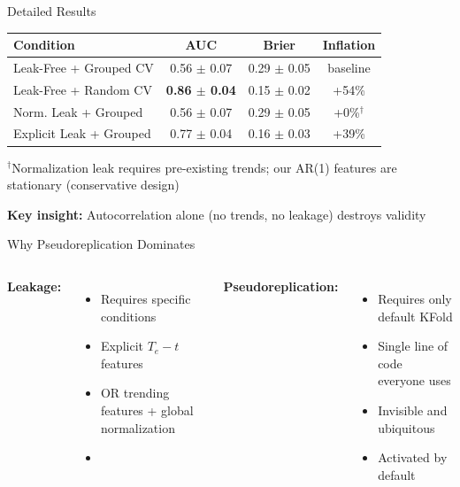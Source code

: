 \documentclass[aspectratio=169]{beamer}
\begin{document}
\begin{frame}{Detailed Results}
\begin{table}
\centering
\small
\begin{tabular}{lccc}
\toprule
\textbf{Condition} & \textbf{AUC} & \textbf{Brier} & \textbf{Inflation} \\
\midrule
Leak-Free + Grouped CV & 0.56 $\pm$ 0.07 & 0.29 $\pm$ 0.05 & baseline \\
\rowcolor{red!10}
Leak-Free + Random CV & \textbf{0.86 $\pm$ 0.04} & 0.15 $\pm$ 0.02 & \alert{+54\%} \\
Norm. Leak + Grouped & 0.56 $\pm$ 0.07 & 0.29 $\pm$ 0.05 & +0\%$^\dagger$ \\
Explicit Leak + Grouped & 0.77 $\pm$ 0.04 & 0.16 $\pm$ 0.03 & +39\% \\
\bottomrule
\end{tabular}
\end{table}

\vspace{0.5em}
\footnotesize
$^\dagger$Normalization leak requires pre-existing trends; our AR(1) features are stationary (conservative design)

\vspace{1em}
\textbf{Key insight:} Autocorrelation alone (no trends, no leakage) destroys validity
\end{frame}

\begin{frame}{Why Pseudoreplication Dominates}
\begin{columns}[T]
\textbf{Leakage:}
\begin{itemize}
\item Requires specific conditions
\item Explicit $T_e - t$ features
\item OR trending features + global normalization
\item {}
\end{itemize}

\textbf{Pseudoreplication:}
\begin{itemize}
\item Requires \alert{only default KFold}
\item Single line of code everyone uses
\item \alert{Invisible and ubiquitous}
\item \alert{Activated by default}
\end{itemize}
\end{columns}

\vspace{2em}
\begin{center}
\end{center}
\end{frame}
\end{document}

